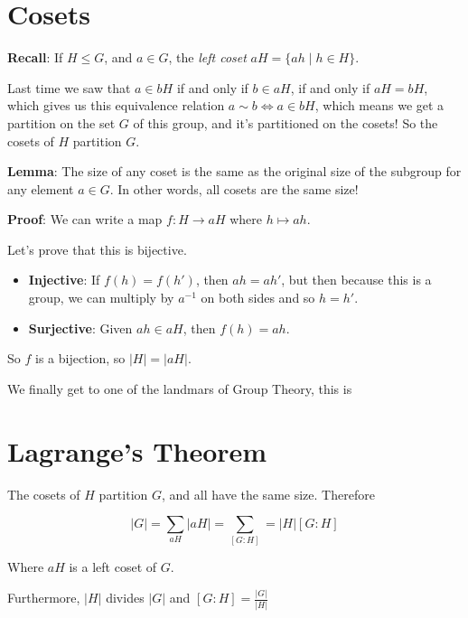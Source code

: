 \documentclass[12pt]{article}
\begin{document}
\section{Cosets}

{\bf Recall}: If $H \le G$, and $a \in G$, the {\it left coset} $aH = \{ah \mid
h \in H \}$.

Last time we saw that $a \in bH$ if and only if $b \in aH$, if and only if $aH =
bH$, which gives us this equivalence relation $a \sim b \Leftrightarrow a \in
bH$, which means we get a partition on the set $G$ of this group, and it's
partitioned on the cosets! So the cosets of $H$ partition $G$.

{\bf Lemma}: The size of any coset is the same as the original size of the
subgroup for any element $a \in G$. In other words, all cosets are the same
size!

{\bf Proof}: We can write a map $f: H \to aH$ where $h \mapsto ah$.

Let's prove that this is bijective.

\begin{itemize}
  \item {\bf Injective}: If $f(h) = f(h')$, then $ah = ah'$, but then because
    this is a group, we can multiply by $a^{-1}$ on both sides and so $h = h'$.

  \item {\bf Surjective}: Given $ah \in aH$, then $f(h) = ah$.
\end{itemize}

So $f$ is a bijection, so $|H| = |aH|$.


We finally get to one of the landmars of Group Theory, this is


\section{Lagrange's Theorem}
{
  The cosets of $H$ partition $G$, and all have the same size. Therefore

  \[
    |G| = \sum_{aH} |aH| = \sum_{[G : H]} = |H| [G : H]
  \]

  Where $aH$ is a left coset of $G$.

  Furthermore, $|H|$ divides $|G|$ and $[G : H] = \frac{|G|}{|H|}$
}
\end{document}

